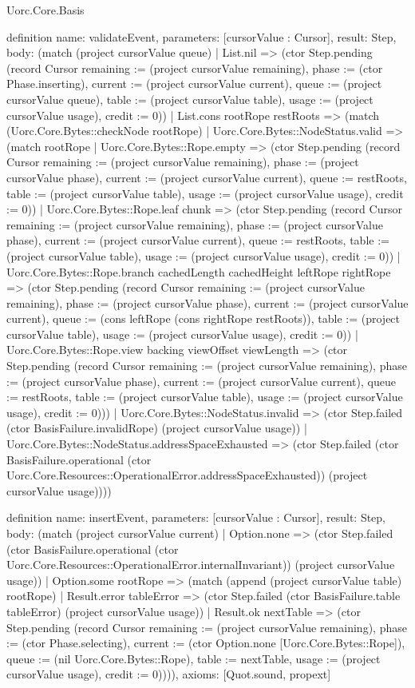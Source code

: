 \begin{lexlean}{Uorc.Core.Basis}
\begin{semanticmodule}
definition{
  name: validateEvent,
  parameters: [cursorValue : Cursor],
  result: Step,
  body: (match (project cursorValue queue)
    | List.nil => (ctor Step.pending (record Cursor {remaining := (project cursorValue remaining), phase := (ctor Phase.inserting), current := (project cursorValue current), queue := (project cursorValue queue), table := (project cursorValue table), usage := (project cursorValue usage), credit := 0}))
    | List.cons rootRope restRoots => (match (Uorc.Core.Bytes::checkNode rootRope)
      | Uorc.Core.Bytes::NodeStatus.valid => (match rootRope
        | Uorc.Core.Bytes::Rope.empty => (ctor Step.pending (record Cursor {remaining := (project cursorValue remaining), phase := (project cursorValue phase), current := (project cursorValue current), queue := restRoots, table := (project cursorValue table), usage := (project cursorValue usage), credit := 0}))
        | Uorc.Core.Bytes::Rope.leaf chunk => (ctor Step.pending (record Cursor {remaining := (project cursorValue remaining), phase := (project cursorValue phase), current := (project cursorValue current), queue := restRoots, table := (project cursorValue table), usage := (project cursorValue usage), credit := 0}))
        | Uorc.Core.Bytes::Rope.branch cachedLength cachedHeight leftRope rightRope => (ctor Step.pending (record Cursor {remaining := (project cursorValue remaining), phase := (project cursorValue phase), current := (project cursorValue current), queue := (cons leftRope (cons rightRope restRoots)), table := (project cursorValue table), usage := (project cursorValue usage), credit := 0}))
        | Uorc.Core.Bytes::Rope.view backing viewOffset viewLength => (ctor Step.pending (record Cursor {remaining := (project cursorValue remaining), phase := (project cursorValue phase), current := (project cursorValue current), queue := restRoots, table := (project cursorValue table), usage := (project cursorValue usage), credit := 0})))
      | Uorc.Core.Bytes::NodeStatus.invalid => (ctor Step.failed (ctor BasisFailure.invalidRope) (project cursorValue usage))
      | Uorc.Core.Bytes::NodeStatus.addressSpaceExhausted => (ctor Step.failed (ctor BasisFailure.operational (ctor Uorc.Core.Resources::OperationalError.addressSpaceExhausted)) (project cursorValue usage))))
}

definition{
  name: insertEvent,
  parameters: [cursorValue : Cursor],
  result: Step,
  body: (match (project cursorValue current)
    | Option.none => (ctor Step.failed (ctor BasisFailure.operational (ctor Uorc.Core.Resources::OperationalError.internalInvariant)) (project cursorValue usage))
    | Option.some rootRope => (match (append (project cursorValue table) rootRope)
      | Result.error tableError => (ctor Step.failed (ctor BasisFailure.table tableError) (project cursorValue usage))
      | Result.ok nextTable => (ctor Step.pending (record Cursor {remaining := (project cursorValue remaining), phase := (ctor Phase.selecting), current := (ctor Option.none [Uorc.Core.Bytes::Rope]), queue := (nil Uorc.Core.Bytes::Rope), table := nextTable, usage := (project cursorValue usage), credit := 0})))),
  axioms: [Quot.sound, propext]
}


\end{semanticmodule}
\end{lexlean}
